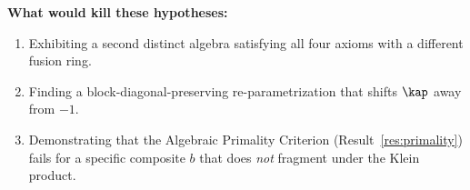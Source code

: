 \textbf{What would kill these hypotheses:}
\begin{enumerate}[noitemsep]
  \item Exhibiting a second distinct algebra satisfying all four axioms with a different fusion ring.
  \item Finding a block-diagonal-preserving re-parametrization that shifts $\kap$ away from $-1$.
  \item Demonstrating that the Algebraic Primality Criterion (Result~\ref{res:primality}) fails for a specific composite $b$ that does \emph{not} fragment under the Klein product.
\end{enumerate}

